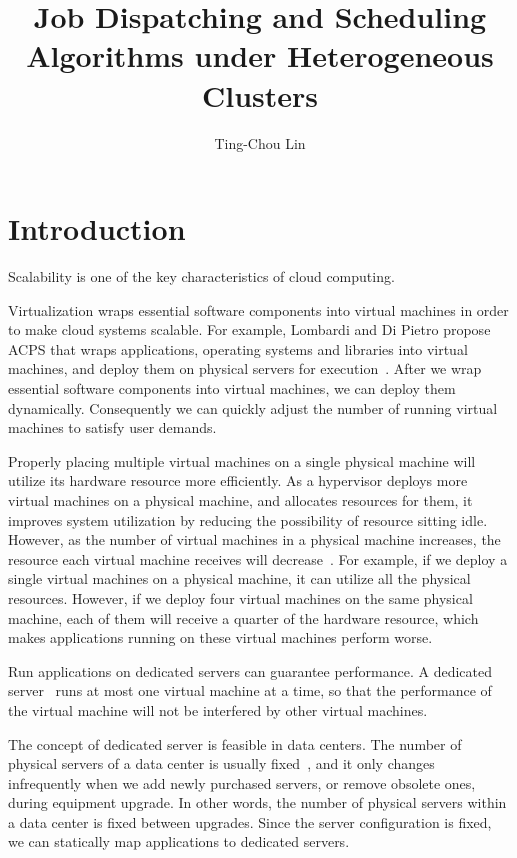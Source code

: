 \documentclass[11pt]{article}
\title{Job Dispatching and Scheduling Algorithms under Heterogeneous
  Clusters}
\author{Ting-Chou Lin}
\date{}
\begin{document}
\maketitle

\section{Introduction}

Scalability is one of the key characteristics of cloud computing.

Virtualization wraps essential software components into virtual machines
in order to make cloud systems scalable.  For example, Lombardi and Di
Pietro propose ACPS 
that wraps applications, operating systems and libraries into virtual
machines, and deploy them on physical servers for
execution~\cite{secure_virt_for_cloud, cloud_issue}.  After we wrap
essential software components into virtual machines, we can deploy them
dynamically.  Consequently we can quickly adjust the number of running
virtual machines to satisfy user demands.

Properly placing multiple virtual machines on a single physical machine
will utilize its hardware resource more efficiently.  As a hypervisor
deploys more virtual machines on a physical machine, and allocates
resources for them, it improves system utilization by reducing the
possibility of resource sitting idle.  However, as the number of virtual
machines in a physical machine increases, the resource each virtual
machine receives will decrease~\cite{resource_overbooking}.  For
example, if we deploy a single virtual machines on a physical machine,
it can utilize all the physical resources.  However, if we deploy four
virtual machines on the same physical machine, each of them will receive
a quarter of the hardware resource, which makes applications running on
these virtual machines perform worse.

Run applications on dedicated servers can guarantee performance.  A
dedicated server~\cite{dedicated_hosting} runs at most one virtual
machine at a time, so that the performance of the virtual machine will
not be interfered by other virtual machines. 

The concept of dedicated server is feasible in data centers.  The
number of physical servers of a data center is usually
fixed~\cite{maintenance_framework}, and it only changes infrequently
when we add newly purchased servers, or remove obsolete ones, during
equipment upgrade.  In other words, the number of physical servers
within a data center is fixed between upgrades.  Since the server
configuration is fixed, we can statically map applications to
dedicated servers.
\end{document}
